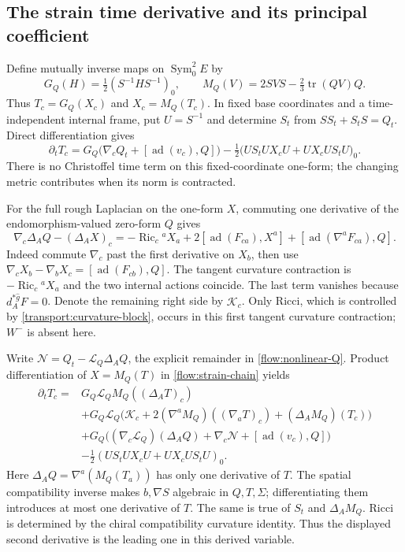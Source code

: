 \documentclass[11pt]{article}
\numberwithin{equation}{section}
\theoremstyle{definition}
\theoremstyle{remark}
\DeclareMathOperator{\Ric}{Ric}
\DeclareMathOperator{\tr}{tr}
\DeclareMathOperator{\Sym}{Sym}
\begin{document}
\subsection{The strain time derivative and its principal coefficient}
\label{subsec:strain-evolution}

Define mutually inverse maps on $\Sym^2_0E$ by
\[
 G_Q(H)=\tfrac12(S^{-1}HS^{-1})_0,\qquad
 M_Q(V)=2SVS-\tfrac23\tr(QV)Q.
\]
Thus $T_c=G_Q(X_c)$ and $X_c=M_Q(T_c)$. In fixed base coordinates and
a time-independent internal frame, put $U=S^{-1}$ and determine $S_t$
from $SS_t+S_tS=Q_t$. Direct differentiation gives
\begin{equation}\label{flow:strain-chain}
 \partial_tT_c=G_Q\bigl(\nabla_cQ_t+[\operatorname{ad}(v_c),Q]\bigr)
 -\tfrac12\bigl(US_tUX_cU+UX_cUS_tU\bigr)_0.
\end{equation}
There is no Christoffel time term on this fixed-coordinate one-form;
the changing metric contributes when its norm is contracted.

For the full rough Laplacian on the one-form $X$, commuting one derivative
of the endomorphism-valued zero-form $Q$ gives
\begin{equation}\label{flow:strain-commutator}
 \nabla_c\Delta_AQ-(\Delta_AX)_c
 =-\Ric_c{}^aX_a+2[\operatorname{ad}(F_{ca}),X^a]
       +[\operatorname{ad}(\nabla^aF_{ca}),Q].
\end{equation}
Indeed commute $\nabla_c$ past the first derivative on $X_b$, then
use $\nabla_cX_b-\nabla_bX_c=[\operatorname{ad}(F_{cb}),Q]$.
The tangent curvature contraction is $-\Ric_c{}^aX_a$ and the two
internal actions coincide. The last term vanishes because
$d_A^{*\widehat g}F=0$. Denote the remaining right side by $\mathcal K_c$.
Only Ricci, which is controlled by \eqref{transport:curvature-block},
occurs in this first tangent curvature contraction; $W^-$ is absent here.

Write $\mathcal N=Q_t-\mathscr L_Q\Delta_AQ$, the explicit remainder
in \eqref{flow:nonlinear-Q}. Product differentiation of $X=M_Q(T)$ in
\eqref{flow:strain-chain} yields
\begin{align*}
 \partial_tT_c={}&G_Q\mathscr L_QM_Q((\Delta_AT)_c)\\
 &+G_Q\mathscr L_Q\bigl(\mathcal K_c
       +2(\nabla^aM_Q)((\nabla_aT)_c)+(\Delta_AM_Q)(T_c)\bigr)\\
 &+G_Q\bigl((\nabla_c\mathscr L_Q)(\Delta_AQ)
               +\nabla_c\mathcal N+[\operatorname{ad}(v_c),Q]\bigr)\\
 &-\tfrac12(US_tUX_cU+UX_cUS_tU)_0.
\end{align*}
Here $\Delta_AQ=\nabla^a(M_Q(T_a))$ has only one derivative of $T$.
The spatial compatibility inverse makes $b,\nabla S$ algebraic in
$Q,T,\Sigma$; differentiating them introduces at most one derivative
of $T$. The same is true of $S_t$ and $\Delta_AM_Q$. Ricci is determined
by the chiral compatibility curvature identity. Thus the displayed
second derivative is the leading one in this derived variable.
\end{document}
